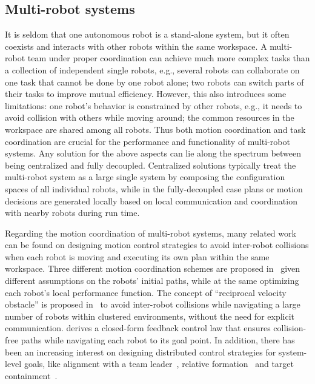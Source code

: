 \subsection{Multi-robot systems}\label{sec:multi-robot}

It is seldom that one autonomous robot is a stand-alone system, but it often coexists and interacts with other robots within the same workspace. A multi-robot team under proper coordination can achieve much more complex tasks than a collection of independent single robots, e.g., several robots can collaborate on one task that cannot be done by one robot alone; two robots can switch parts of their tasks to improve mutual efficiency.  However, this also introduces some limitations: one robot's behavior is constrained  by other robots, e.g., it needs to avoid collision with others while moving around; the common resources in the workspace are shared among all robots.
Thus both motion coordination and task coordination are crucial for the performance and functionality of multi-robot systems.
Any solution for the above aspects can lie along the spectrum between being centralized and fully decoupled. Centralized solutions typically treat the multi-robot system as a large single system by composing the configuration spaces of all individual robots, while in the fully-decoupled case plans or motion decisions  are generated locally based on local communication and coordination with nearby robots during run time.

Regarding the motion coordination of multi-robot systems, many related work can be found on designing motion control strategies to avoid inter-robot collisions when each robot is moving and executing its own plan within the same workspace.
Three different motion coordination schemes are proposed in~\cite{lavalle1998optimal} given different assumptions on the robots' initial paths, while at the same optimizing each robot's local performance function.
The concept of ``reciprocal velocity obstacle'' is proposed in~\cite{van2008reciprocal} to avoid inter-robot collisions while navigating a large number of robots within clustered environments, without the need for explicit communication.
\cite{dimarogonas2007decentralized} derives a closed-form feedback control law that ensures collision-free paths while navigating each robot to its goal point.
In addition, there has been an increasing interest on designing distributed control strategies for system-level goals, like alignment with a team leader~\cite{egerstedt2001control}, relative formation~\cite{egerstedt2001formation} and target containment~\cite{ji2008containment}.



